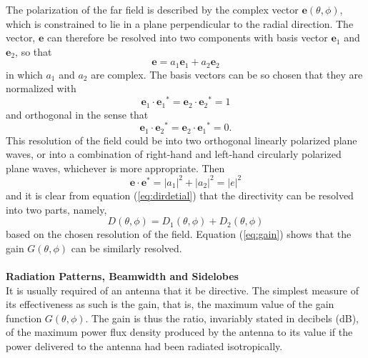 The polarization of the far field is described by the complex vector $\mathbf{e}(\theta,\phi)$, which is constrained to lie in a plane perpendicular to the radial direction. The vector, $\mathbf{e}$ can therefore be resolved into two components with basis vector $\mathbf{e}_1$ and $\mathbf{e}_2$, so that
\begin{equation}
\mathbf{e}=a_1\mathbf{e}_1+a_2\mathbf{e}_2
\end{equation}
in which $a_1$ and $a_2$ are complex. The basis vectors can be so chosen that they are normalized with
\begin{equation}
\mathbf{e}_1\cdot{\mathbf{e}_1}^*=\mathbf{e}_2\cdot{\mathbf{e}_2}^*=1
\end{equation}
and orthogonal in the sense that
\begin{equation}
\mathbf{e}_1\cdot{\mathbf{e}_2}^*=\mathbf{e}_2\cdot{\mathbf{e}_1}^*=0 .
\end{equation}
This resolution of the field could be into two orthogonal linearly polarized plane waves, or into a combination of right-hand and left-hand circularly polarized plane waves, whichever is more appropriate. Then
\begin{equation}
\mathbf{e}\cdot{\mathbf{e}}^*=|a_1|^2+|a_2|^2=|e|^2
\end{equation}
and it is clear from equation (\ref{eq:dirdetial}) that the directivity can be resolved into two parts, namely,
\begin{equation}
D(\theta,\phi)=D_1(\theta,\phi)+D_2(\theta,\phi)
\end{equation}
based on the chosen resolution of the field. Equation (\ref{eq:gain}) shows that the gain $G(\theta,\phi)$ can be similarly resolved.\\
\\
\textbf{Radiation Patterns, Beamwidth and Sidelobes}\\
It is usually required of an antenna that it be directive. The simplest measure of its effectiveness as such is the gain, that is, the maximum value of the gain function $G(\theta,\phi)$. The gain is thus the ratio, invariably stated in decibels (dB), of the maximum power flux density produced by the antenna to its value if the power delivered to the antenna had been radiated isotropically.

